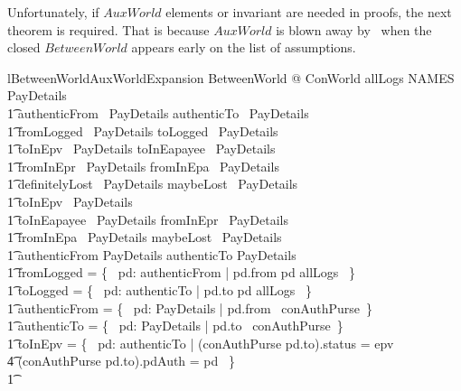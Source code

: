 Unfortunately, if $AuxWorld$ elements or invariant are needed in proofs, the
next theorem is required. That is because $AuxWorld$ is blown away by \zeves\
when the closed $BetweenWorld$ appears early on the list of assumptions.
%
\begin{LNewLemma}
\begin{zeves-theorem}{lBetweenWorldAuxWorldExpansion}
    \forall BetweenWorld @ ConWorld \land
            allLogs \in NAMES \rel PayDetails \land \\ \t1
            authenticFrom \in \power~PayDetails \land
            authenticTo \in \power~PayDetails \land \\ \t1
            fromLogged \in \power~PayDetails \land
            toLogged \in \power~PayDetails \land \\ \t1
            toInEpv \in \power~PayDetails \land
            toInEapayee \in \power~PayDetails \land \\ \t1
            fromInEpr \in \power~PayDetails \land
            fromInEpa \in \power~PayDetails \land \\ \t1
            definitelyLost \in \power~PayDetails \land
            maybeLost \in \power~PayDetails \land \\
         \t1
            toInEpv \in \finset~PayDetails \land \\ \t1
            toInEapayee \in \finset~PayDetails \land
            fromInEpr \in \finset~PayDetails \land \\ \t1
            fromInEpa \in \finset~PayDetails \land
            maybeLost \in \finset~PayDetails \land \\ \t1
            authenticFrom \in \finset PayDetails \land
            authenticTo \in \finset PayDetails \land \\ \t1
            fromLogged = \{~ pd: authenticFrom | pd.from \mapsto pd \in allLogs ~\} \land \\ \t1
            toLogged = \{~ pd: authenticTo | pd.to \mapsto pd \in allLogs ~\} \land \\ \t1
            authenticFrom = \{~ pd: PayDetails | pd.from \in \dom~conAuthPurse~\} \land \\ \t1
            authenticTo = \{~ pd: PayDetails | pd.to \in \dom~conAuthPurse~\} \land \\ \t1
            toInEpv = \{~ pd: authenticTo | (conAuthPurse pd.to).status = epv \\
                    \t4 \land (conAuthPurse pd.to).pdAuth = pd ~\} \land \\ \t1

\end{zeves-theorem}
\end{LNewLemma}

